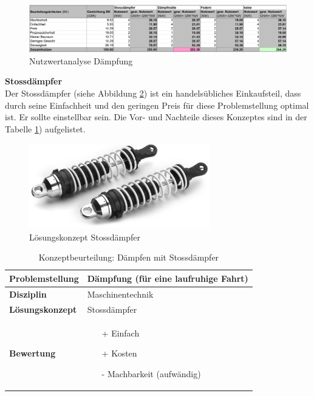 \documentclass[../../../main.tex]{subfiles}
\begin{document}
  \begin{figure}[H] %
    \centering
    \includegraphics[width=1\textwidth]{Daempfung}
    \caption{Nutzwertanalyse Dämpfung}
    \label{fig:daempfung}
\end{figure}

  \textbf{Stossdämpfer}\\
  Der Stossdämpfer (siehe Abbildung \ref{fig:stossdaempfer}) ist ein handelsübliches Einkaufsteil, dass durch seine Einfachheit und den geringen Preis für diese Problemstellung optimal ist. Er sollte einstellbar sein. Die Vor- und Nachteile dieses Konzeptes sind in der Tabelle \ref{tab:stossdaempfer}) aufgelistet.

  \begin{figure}[H] %
    \centering
    \includegraphics[width=0.7\textwidth]{Stossdaempfer}
    \caption{Lösungskonzept Stossdämpfer}
    \label{fig:stossdaempfer}
  \end{figure}

  \begin{flushleft}
    \begin{table}[h]
    \begin{tabular}{ | l | p{11cm} |}
    \hline
    \textbf{Problemstellung} & Dämpfung (für eine laufruhige Fahrt) \\ \hline
    \textbf{Disziplin} & Maschinentechnik \\ \hline
    \textbf{Lösungskonzept} & Stossdämpfer \\ \hline
    \textbf{Bewertung} &  \begin{itemize}
                            \item[+] Einfach
                            \item[+] Kosten
                            \item[-] Machbarkeit (aufwändig)
                          \end{itemize} \\ \hline
    \end{tabular}
    \caption{Konzeptbeurteilung: Dämpfen mit Stossdämpfer}
    \label{tab:stossdaempfer}
\end{table}
\end{flushleft}
\end{document}
